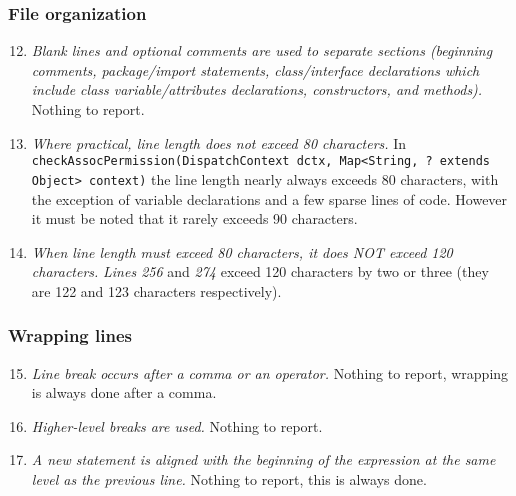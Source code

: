 	\subsubsection{File organization}
		\begin{enumerate}
			\setcounter{enumi}{11}
			\item \textit{Blank lines and optional comments are used to separate sections (beginning comments, package/import statements, class/interface declarations which include class variable/attributes declarations, constructors, and methods).}\newline
			Nothing to report. %

			\item \textit{Where practical, line length does not exceed 80 characters.}\newline
			In \texttt{checkAssocPermission(DispatchContext dctx, Map<String, ? extends Object> context)} the line length nearly always exceeds 80 characters, with the exception of variable declarations and a few sparse lines of code. However it must be noted that it rarely exceeds 90 characters.

			\item \textit{When line length must exceed 80 characters, it does NOT exceed 120 characters.}\newline
			\textit{Lines 256} and \textit{274} exceed 120 characters by two or three (they are 122 and 123 characters respectively). 

		\end{enumerate}

	\subsubsection{Wrapping lines}
		\begin{enumerate}
			\setcounter{enumi}{14}
			\item \textit{Line break occurs after a comma or an operator.}\newline
			Nothing to report, wrapping is always done after a comma. %

			\item \textit{Higher-level breaks are used.}\newline
			Nothing to report. %

			\item \textit{A new statement is aligned with the beginning of the expression at the same level as the previous line.}\newline
			Nothing to report, this is always done. %

		\end{enumerate}

